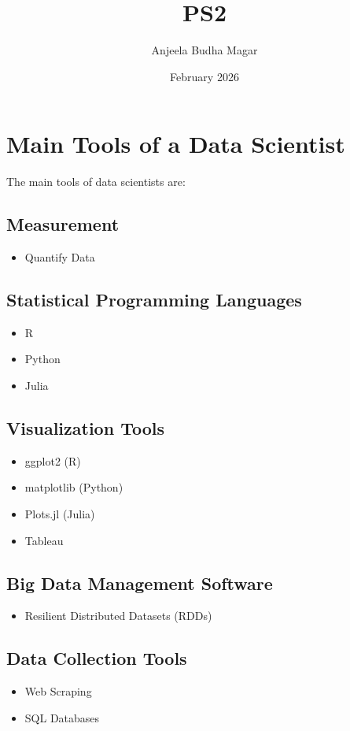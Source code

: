 \documentclass{article}
\title{PS2}
\author{Anjeela Budha Magar}
\date{February 2026}
\begin{document}
\maketitle

\section{Main Tools of a Data Scientist}

The main tools of data scientists are:
\subsection{Measurement}
\begin{itemize}
    \item Quantify Data
\end{itemize}
\subsection{Statistical Programming Languages}
\begin{itemize}
    \item R
    \item Python
    \item Julia
\end{itemize}
\subsection{Visualization Tools}
\begin{itemize}
    \item ggplot2 (R)
    \item matplotlib (Python)
    \item Plots.jl (Julia)
    \item Tableau
\end{itemize}
\subsection{Big Data Management Software}
\begin{itemize}
    \item Resilient Distributed Datasets (RDDs)
\end{itemize}
\subsection{Data Collection Tools}
\begin{itemize}
    \item Web Scraping
      \item SQL Databases
\end{itemize}
\end{document}
